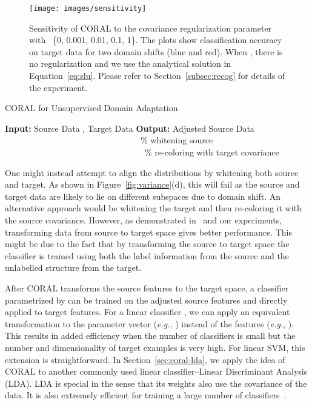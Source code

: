 \documentclass[graybox]{svmult}
\newcommand\eg{\emph{e.g.}}
\begin{document}
\begin{figure}
\centering
\texttt{[image: images/sensitivity]}
\caption{\small Sensitivity of CORAL to the covariance regularization parameter~ with~ \{0, 0.001, 0.01, 0.1, 1\}. The plots show classification accuracy on target data for two domain shifts (blue and red). When , there is no regularization and we use the analytical solution in Equation~\eqref{eq:slu}. Please refer to Section~\ref{subsec:recog} for details of the experiment.}
\label{fig:sens}
\end{figure}

\begin{algorithm}
\caption{CORAL for Unsupervised Domain Adaptation}
\begin{small}
\begin{algorithmic} 
\STATE \textbf{Input:} Source Data , Target Data 
\STATE \textbf{Output:} Adjusted Source Data 
\STATE 
\STATE 
\STATE   ~~~~~~~~~~~~~~~~~~~~~~~~~~~~~~~~\% whitening source
\STATE   ~~~~~~~~~~~~~~~~~~~~~~~~~~~~~~~~~\% re-coloring with target covariance
\end{algorithmic} 
\end{small}
\label{alg:coral}
\end{algorithm}

One might instead attempt to align the distributions by whitening both source and target. As shown in Figure~\ref{fig:variance}(d), this will fail as the source and target data are likely to lie on different subspaces due to domain shift. An alternative approach would be whitening the target and then re-coloring it with the source covariance. However, as demonstrated in~\cite{outlooks,sa} and our experiments, transforming data from source to target space gives better performance. 
This might be due to the fact that by transforming the source to target space the classifier is trained using both the label information from the source and the unlabelled structure from the target.

After CORAL transforms the source features to the target space, a classifier  parametrized by  can be trained on the adjusted source features and directly applied to target features. For a linear classifier , we can apply an equivalent transformation to the parameter vector  (\eg, ) instead of the features (\eg, ). This results in added efficiency when the number of classifiers is small but the number and dimensionality of target examples is very high. For linear SVM, this extension is straightforward. In Section~\ref{sec:coral-lda}, we apply the idea of CORAL to another commonly used linear classifier--Linear Discriminant Analysis (LDA). LDA is special in the sense that its weights also use the covariance of the data. It is also extremely efficient for training a large number of classifiers~\cite{who}. 
\end{document}
